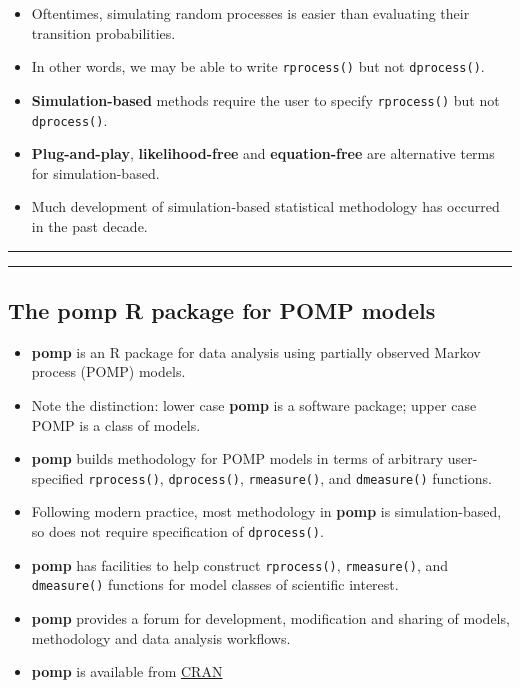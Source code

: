 \documentclass[]{article}
\begin{document}
\begin{itemize}
\item
  Oftentimes, simulating random processes is easier than evaluating
  their transition probabilities.
\item
  In other words, we may be able to write \texttt{rprocess()} but not
  \texttt{dprocess()}.
\item
  \textbf{Simulation-based} methods require the user to specify
  \texttt{rprocess()} but not \texttt{dprocess()}.
\item
  \textbf{Plug-and-play}, \textbf{likelihood-free} and
  \textbf{equation-free} are alternative terms for simulation-based.
\item
  Much development of simulation-based statistical methodology has
  occurred in the past decade.
\end{itemize}

\begin{center}\rule{0.5\linewidth}{\linethickness}\end{center}

\begin{center}\rule{0.5\linewidth}{\linethickness}\end{center}

\subsection{\texorpdfstring{The \textbf{pomp} \textbf{R} package for
POMP
models}{The pomp R package for POMP models}}\label{the-pomp-r-package-for-pomp-models}

\begin{itemize}
\item
  \textbf{pomp} is an R package for data analysis using partially
  observed Markov process (POMP) models.
\item
  Note the distinction: lower case \textbf{pomp} is a software package;
  upper case POMP is a class of models.
\item
  \textbf{pomp} builds methodology for POMP models in terms of arbitrary
  user-specified \texttt{rprocess()}, \texttt{dprocess()},
  \texttt{rmeasure()}, and \texttt{dmeasure()} functions.
\item
  Following modern practice, most methodology in \textbf{pomp} is
  simulation-based, so does not require specification of
  \texttt{dprocess()}.
\item
  \textbf{pomp} has facilities to help construct \texttt{rprocess()},
  \texttt{rmeasure()}, and \texttt{dmeasure()} functions for model
  classes of scientific interest.
\item
  \textbf{pomp} provides a forum for development, modification and
  sharing of models, methodology and data analysis workflows.
\item
  \textbf{pomp} is available from
  \href{https://cran.r-project.org/web/packages/pomp/index.html}{CRAN}
\end{itemize}
\end{document}
